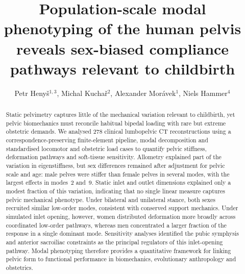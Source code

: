 \documentclass[openacc]{rsproca_new}
\begin{document}
\title{Population-scale modal phenotyping of the human pelvis reveals sex-biased compliance pathways relevant to childbirth}

\author{Petr Heny\v{s}$^{1,3}$, Michal Kucha\v{r}$^{2}$, Alexander Mor\'avek$^{1}$, Niels Hammer$^{4}$}

\address{$^{1}$Institute of New Technologies and Applied Informatics, Faculty of Mechatronics, Informatics and Interdisciplinary Studies, Technical University of Liberec, Liberec, Czech Republic\\
$^{2}$Department of Anatomy, Faculty of Medicine in Hradec Kr\'alov\'e, Charles University, Hradec Kr\'alov\'e, Czech Republic\\
$^{3}$Division of Macroscopic and Clinical Anatomy, Gottfried Schatz Research Center, Medical University of Graz, Graz, Austria\\
$^{4}$Division of Macroscopic and Clinical Anatomy, Gottfried Schatz Research Center, Medical University of Graz, Graz, Austria; Department of Orthopedic and Trauma Surgery, University of Leipzig, Leipzig, Germany; Division of Biomechatronics, Fraunhofer IWU, Dresden, Germany}

\subject{biomechanics, evolutionary anthropology, obstetrics}



\begin{abstract}
Static pelvimetry captures little of the mechanical variation relevant to childbirth, yet pelvic biomechanics must reconcile habitual bipedal loading with rare but extreme obstetric demands. We analysed 278 clinical lumbopelvic CT reconstructions using a correspondence-preserving finite-element pipeline, modal decomposition and standardised locomotor and obstetric load cases to quantify pelvic stiffness, deformation pathways and soft-tissue sensitivity. Allometry explained part of the variation in eigenstiffness, but sex differences remained after adjustment for pelvic scale and age: male pelves were stiffer than female pelves in several modes, with the largest effects in modes~2 and~9. Static inlet and outlet dimensions explained only a modest fraction of this variation, indicating that no single linear measure captures pelvic mechanical phenotype. Under bilateral and unilateral stance, both sexes recruited similar low-order modes, consistent with conserved support mechanics. Under simulated inlet opening, however, women distributed deformation more broadly across coordinated low-order pathways, whereas men concentrated a larger fraction of the response in a single dominant mode. Sensitivity analyses identified the pubic symphysis and anterior sacroiliac constraints as the principal regulators of this inlet-opening pathway. Modal phenotyping therefore provides a quantitative framework for linking pelvic form to functional performance in biomechanics, evolutionary anthropology and obstetrics.
\end{abstract}
\end{document}
